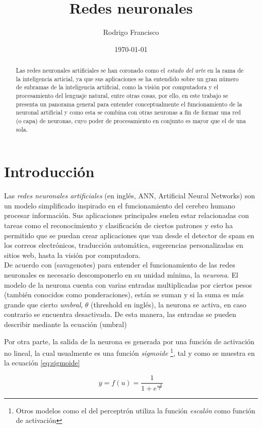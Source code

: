 \documentclass{article}
\author{Rodrigo Francisco}
\title{Redes neuronales}
\date{\today}
\begin{document}
  \begin{abstract}
    Las redes neuronales artificiales se han coronado como el \textit{estado del
    arte} en la rama de la inteligencia articial, ya que sus aplicaciones se ha
    entendido sobre un gran número de subramas de la inteligencia artificial,
    como la visión por computadora y el procesamiento del lenguaje natural,
    entre otras cosas, por ello, en este trabajo se presenta un panorama general
    para entender conceptualmente el funcionamiento de la neuronal artificial y
    como esta se combina con otras neuronas a fin de formar una red (o capa) de
    neuronas, cuyo poder de procesamiento en conjunto es mayor que el de una
    sola.
  \end{abstract}

  \section{Introducción}

  Las \textit{redes neuronales artificiales} (en inglés, ANN, Artificial Neural
  Networks) son un modelo simplificado inspirado en el funcionamiento del
  cerebro humano procesar información. Sus aplicaciones principales suelen estar
  relacionadas con tareas como el reconocimiento y clasificación de ciertos
  patrones y esto ha permitido que se puedan crear aplicaciones que van desde el
  detector de spam en los correos electrónicos, traducción automática,
  sugerencias personalizadas en sitios web, hasta la visión por
  computadora.\\

  De acuerdo con (savagenotes) para entender el funcionamiento de las redes
  neuronales es necesario descomponerlo en su unidad mínima, la
  \textit{neurona}.  El modelo
  de la neurona cuenta con varias entradas multiplicadas por ciertos pesos
  (también conocidos como ponderaciones), están se suman y si la suma es más
  grande que cierto \textit{umbral}, \(\theta\) (threshold en inglés), la neurona
  se activa, en caso contrario se encuentra desactivada. De esta manera, las
  entradas se pueden describir mediante la ecuación (umbral)


  Por otra parte, la salida de la neurona es generada por una función de
  activación no lineal, la cual usualmente es una función \textit{sigmoide}
  \footnote{Otros modelos como el del perceptrón utiliza la función
  \textit{escalón} como función de activación}, tal y como se muestra en la
  ecuación \ref{eq:sigmoide}

  \begin{equation}
    y = f(u) = \dfrac{1}{1+e^{\frac{-u}{T}}} \label{eq:sigmoide}
  \end{equation}
\end{document}

